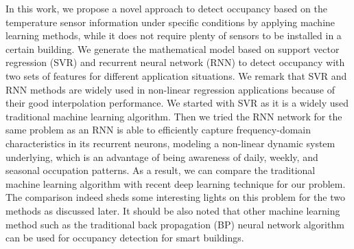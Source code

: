 In this work, we propose a novel approach to detect occupancy based on
the temperature sensor information under specific conditions by
applying machine learning methods, while it does not require plenty of
sensors to be installed in a certain building.  We generate the
mathematical model based on support vector regression (SVR) and
recurrent neural network (RNN) to detect occupancy with two sets of
features for different application situations. \textcolor{feb18rev}{We
  remark that SVR and RNN methods are widely used in non-linear
  regression applications because of their good interpolation
  performance.  We started with SVR as it is a widely used traditional
  machine learning algorithm. Then we tried the RNN network for the
  same problem as an RNN is able to efficiently capture
  frequency-domain characteristics in its recurrent neurons, modeling
  a non-linear dynamic system underlying, which is an advantage of
  being awareness of daily, weekly, and seasonal occupation patterns.
  As a result, we can compare the traditional machine learning
  algorithm with recent deep learning technique for our problem. The
  comparison indeed sheds some interesting lights on this problem for
  the two methods as discussed later.  It should be also noted that
  other machine learning method such as the traditional back
  propagation (BP) neural network algorithm can be used for occupancy
  detection for smart buildings.}

